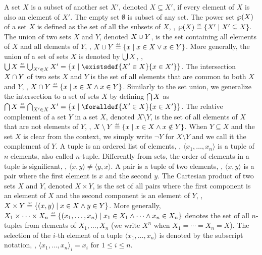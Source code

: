 A set $X$ is a subset of another set $X'$, denoted $X \subseteq X'$, if every element of $X$ is also an element of $X'$. The empty set $\emptyset$ is subset of any set. The power set $\wp(X)$ of a set $X$ is defined as the set of all the subsets of $X$, \ie, $\setof{X} \defeq \setdef{X'}{X' \subseteq X}$. The union of two sets $X$ and $Y$, denoted $X \cup Y$, is the set containing all elements of $X$ and all elements of $Y$, \ie, $X \setjoin Y \defeq \setdef{x}{x \in X \lor x \in Y}$. More generally, the union of a set of sets $X$ is denoted by $\bigcup X$, \ie, $\bigsetjoin X \defeq \bigsetjoin_{X' \in X} X' = \setdef{x}{\existsdef{X' \in X}{x \in X'}}$. The intersection $X \cap Y$ of two sets $X$ and $Y$ is the set of all elements that are common to both $X$ and $Y$, \ie, $X \setmeet Y \defeq \setdef{x}{x \in X \land x \in Y}$.
Similarly to the set union, we generalize the intersection to a set of sets $X$ by defining $\bigcap X$ as $\bigsetmeet X \defeq \bigsetmeet_{X' \in X} X' = \setdef{x}{\foralldef{X' \in X}{x \in X'}}$. The relative complement of a set $Y$ in a set $X$, denoted $X \setminus Y$, is the set of all elements of $X$ that are not elements of $Y$, \ie, $X \setminus Y \defeq \setdef{x}{x \in X \land x \notin Y}$. When $Y \subseteq X$ and the set $X$ is clear from the context, we simply write $\neg Y$ for $X \setminus Y$ and we call it the complement of $Y$.
A tuple is an ordered list of elements, \eg, $\langle x_1, \dots, x_n \rangle$ is a tuple of $n$ elements, also called $n$-tuple. Differently from sets, the order of elements in a tuple is significant, \eg, $\langle x, y \rangle \neq \langle y, x \rangle$.
A pair is a tuple of two elements, \eg, $\langle x, y \rangle$ is a pair where the first element is $x$ and the second $y$.
The Cartesian product of two sets $X$ and $Y$, denoted $X \times Y$, is the set of all pairs where the first component is an element of $X$ and the second component is an element of $Y$, \ie, $X \times Y \defeq \setdef{(x, y)}{x \in X \land y \in Y}$.
More generally, $X_1 \times \cdots \times X_n \defeq \setdef{(x_1, \ldots, x_n)}{x_1 \in X_1 \land \cdots \land x_n \in X_n}$ denotes the set of all $n$-tuples from elements of $X_1, \dots, X_n$ (we write $X^n$ when $X_1 = \cdots = X_n = X$).
The selection of the
$i$-th element of a tuple
$\langle{x_1, \dots, x_n}\rangle$ is denoted by the subscript notation, \ie,
${\langle{x_1, \dots, x_n}\rangle}_i = x_i$ for
$1 \le i \le n$.


